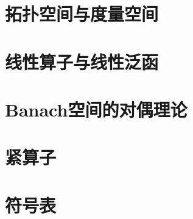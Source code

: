 \documentclass[openany]{ctexbook}
\begin{document}
    \maketitle
    \tableofcontents
    \chapter{拓扑空间与度量空间}
        
    \chapter{线性算子与线性泛函}
        
    \chapter{Banach空间的对偶理论}
        
    \chapter{紧算子}
        
    \chapter{符号表}
        
    \printindex
\end{document}
